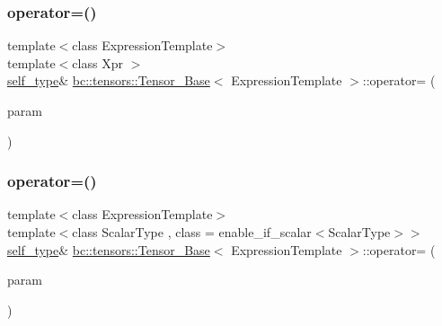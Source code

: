 \mbox{\label{classbc_1_1tensors_1_1Tensor__Base_abfe07c092882deebf54de9d4d1f0e570}} 
\subsubsection{\texorpdfstring{operator=()}{operator=()}\hspace{0.1cm}{\footnotesize\ttfamily [1/4]}}
{\footnotesize\ttfamily template$<$class Expression\+Template$>$ \\
template$<$class Xpr $>$ \\
\hyperlink{classbc_1_1tensors_1_1Expression__Base}{self\+\_\+type}\& \hyperlink{classbc_1_1tensors_1_1Tensor__Base}{bc\+::tensors\+::\+Tensor\+\_\+\+Base}$<$ Expression\+Template $>$\+::operator= (\begin{DoxyParamCaption}\item[{const \hyperlink{classbc_1_1tensors_1_1Expression__Base}{Expression\+\_\+\+Base}$<$ Xpr $>$ \&}]{param }\end{DoxyParamCaption})\hspace{0.3cm}{\ttfamily [inline]}}

\mbox{\label{classbc_1_1tensors_1_1Tensor__Base_a137e4c4646c288a963246df0e99f1c68}} 
\subsubsection{\texorpdfstring{operator=()}{operator=()}\hspace{0.1cm}{\footnotesize\ttfamily [2/4]}}
{\footnotesize\ttfamily template$<$class Expression\+Template$>$ \\
template$<$class Scalar\+Type , class  = enable\+\_\+if\+\_\+scalar$<$\+Scalar\+Type$>$$>$ \\
\hyperlink{classbc_1_1tensors_1_1Expression__Base}{self\+\_\+type}\& \hyperlink{classbc_1_1tensors_1_1Tensor__Base}{bc\+::tensors\+::\+Tensor\+\_\+\+Base}$<$ Expression\+Template $>$\+::operator= (\begin{DoxyParamCaption}\item[{const Scalar\+Type \&}]{param }\end{DoxyParamCaption})\hspace{0.3cm}{\ttfamily [inline]}}

